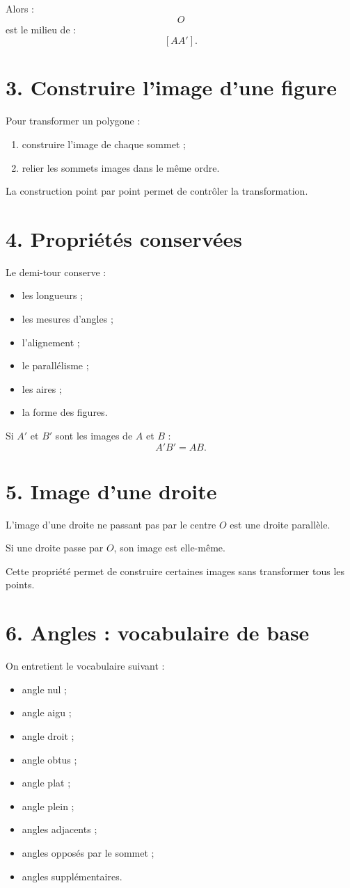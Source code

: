 Alors :
\[
O
\]
est le milieu de :
\[
[AA'].
\]

\section{3. Construire l'image d'une figure}

Pour transformer un polygone :
\begin{enumerate}
\item construire l'image de chaque sommet ;
\item relier les sommets images dans le même ordre.
\end{enumerate}

La construction point par point permet de contrôler la transformation.

\section{4. Propriétés conservées}

Le demi-tour conserve :
\begin{itemize}
\item les longueurs ;
\item les mesures d'angles ;
\item l'alignement ;
\item le parallélisme ;
\item les aires ;
\item la forme des figures.
\end{itemize}

Si $A'$ et $B'$ sont les images de $A$ et $B$ :
\[
A'B'=AB.
\]

\section{5. Image d'une droite}

L'image d'une droite ne passant pas par le centre $O$ est une droite parallèle.

Si une droite passe par $O$, son image est elle-même.

Cette propriété permet de construire certaines images sans transformer tous les points.

\section{6. Angles : vocabulaire de base}

On entretient le vocabulaire suivant :
\begin{itemize}
\item angle nul ;
\item angle aigu ;
\item angle droit ;
\item angle obtus ;
\item angle plat ;
\item angle plein ;
\item angles adjacents ;
\item angles opposés par le sommet ;
\item angles supplémentaires.
\end{itemize}

